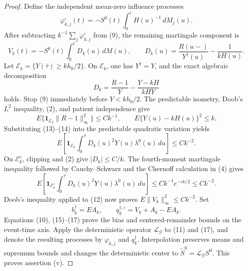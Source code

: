 \documentclass{article}
\begin{document}
\begin{proof}
Define the independent mean-zero influence processes
\[
 \varphi_{k,j}^{\circ}(t)
 =-S^0(t)\int_0^tH(u)^{-1}\,dM_j(u).                    \tag{11}
\]
After subtracting \(k^{-1}\sum_j\varphi_{k,j}^{\circ}\) from (9), the
remaining martingale component is
\[
 V_k(t)=-S^0(t)\int_0^tD_k(u)\,dM(u),
 \qquad
 D_k(u)=\frac{R(u-)}{Y^\dagger(u)}-\frac{1}{kH(u)}.      \tag{12}
\]
Let \(\mathcal E_k=\{Y(\bar\tau)\geq kh_0/2\}\).  On
\(\mathcal E_k\), one has \(Y^\dagger=Y\), and the exact algebraic
decomposition
\[
 D_k
 =\frac{R-1}{Y}-\frac{Y-kH}{kHY}                       \tag{13}
\]
holds.  Stop (9) immediately before \(Y<kh_0/2\).  The predictable
isometry, Doob's \(L^2\) inequality, (2), and patient independence give
\[
 E\{\mathbf 1_{\mathcal E_k}\|R-1\|_\infty^2\}
 \leq Ck^{-1},
 \qquad
 E\{Y(u)-kH(u)\}^2\leq k.                               \tag{14}
\]
Substituting (13)--(14) into the predictable quadratic variation yields
\[
 E\left[\mathbf 1_{\mathcal E_k}
 \int_0^{\bar\tau}D_k(u)^2Y(u)\lambda^0(u)\,du\right]
 \leq Ck^{-2}.                                           \tag{15}
\]
On \(\mathcal E_k^c\), clipping and (2) give
\(|D_k|\leq C/k\).  The fourth-moment martingale inequality followed by
Cauchy--Schwarz and the Chernoff calculation in (4) gives
\[
 E\left[\mathbf 1_{\mathcal E_k^c}
 \int_0^{\bar\tau}D_k(u)^2Y(u)\lambda^0(u)\,du\right]
 \leq Ck^{-1}e^{-ck/2}\leq Ck^{-2}.                     \tag{16}
\]
Doob's inequality applied to (12) now proves
\(E\|V_k\|_\infty^2\leq Ck^{-2}\).  Set
\[
 b_k^\dagger=EA_k,
 \qquad q_k^{\dagger,\circ}=V_k+A_k-EA_k.               \tag{17}
\]
Equations (10), (15)--(17) prove the bias and centered-remainder bounds on
the event-time axis.  Apply the deterministic operator
\(\mathcal L_{\mathcal G}\) to (11) and (17), and denote the resulting
processes by \(\varphi_{k,j}\) and \(q_k^\dagger\).  Interpolation preserves
means and supremum bounds and changes the deterministic center to
\(\widetilde S^0=\mathcal L_{\mathcal G}S^0\).  This proves assertion (v).


\end{proof}
\end{document}
